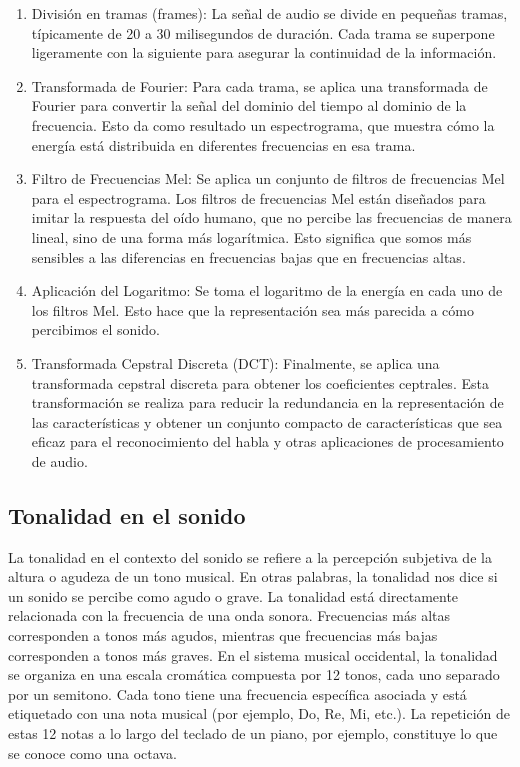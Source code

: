 \documentclass[letterpaper, 12pt]{article}
\begin{document}
\begin{enumerate}
	\item División en tramas (frames): La señal de audio se divide en
	      pequeñas tramas, típicamente de 20 a 30 milisegundos de
	      duración. Cada trama se superpone ligeramente con la
	      siguiente para asegurar la continuidad de la información.

	\item Transformada de Fourier: Para cada trama, se aplica una
	      transformada de Fourier para convertir la señal del dominio
	      del tiempo al dominio de la frecuencia. Esto da como
	      resultado un espectrograma, que muestra cómo la energía
	      está distribuida en diferentes frecuencias en esa trama.

	\item Filtro de Frecuencias Mel: Se aplica un conjunto de filtros
	      de frecuencias Mel para el espectrograma. Los filtros de
	      frecuencias Mel están diseñados para imitar la respuesta
	      del oído humano, que no percibe las frecuencias de manera
	      lineal, sino de una forma más logarítmica. Esto significa
	      que somos más sensibles a las diferencias en frecuencias
	      bajas que en frecuencias altas.

	\item Aplicación del Logaritmo: Se toma el logaritmo de la
	      energía en cada uno de los filtros Mel. Esto hace que la
	      representación sea más parecida a cómo percibimos el
	      sonido.

	\item Transformada Cepstral Discreta (DCT): Finalmente, se aplica
	      una transformada cepstral discreta para obtener los
	      coeficientes ceptrales. Esta transformación se realiza para
	      reducir la redundancia en la representación de las
	      características y obtener un conjunto compacto de
	      características que sea eficaz para el reconocimiento del
	      habla y otras aplicaciones de procesamiento de audio.
\end{enumerate}

\subsection*{Tonalidad en el sonido~\cite{tonalidad}}

La tonalidad en el contexto del sonido se refiere a la
percepción subjetiva de la altura o agudeza de un tono
musical. En otras palabras, la tonalidad nos dice si un
sonido se percibe como agudo o grave. La tonalidad está
directamente relacionada con la frecuencia de una onda
sonora. Frecuencias más altas corresponden a tonos más
agudos, mientras que frecuencias más bajas corresponden a
tonos más graves. En el sistema musical occidental, la
tonalidad se organiza en una escala cromática compuesta por
12 tonos, cada uno separado por un semitono. Cada tono
tiene una frecuencia específica asociada y está etiquetado
con una nota musical (por ejemplo, Do, Re, Mi, etc.). La
repetición de estas 12 notas a lo largo del teclado de un
piano, por ejemplo, constituye lo que se conoce como una
octava.
\end{document}

